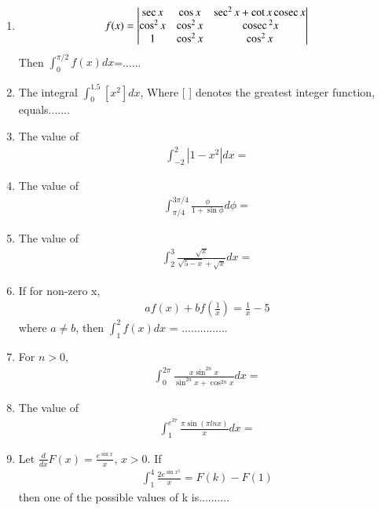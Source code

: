 \renewcommand{\theequation}{\theenumi}
\begin{enumerate}[label=\arabic*.,ref=\thesubsection.\theenumi]

\item 
\begin{align*}
f(x) = \begin{vmatrix}
\sec x & \cos x & \sec^{2}x + \cot x \,\text{cosec}\, x \\ \cos^{2}x & \cos^{2}x & \,\text{cosec}\,^{2}x \\ 1 & \cos^{2}x & \cos^{2}x
\end{vmatrix}
\end{align*}
Then $\int_{0}^{\pi/2}f(x)dx$=......

\item The integral $\int_{0}^{1.5}[x^{2}]dx$, Where [ ] denotes the greatest integer function, equals.......

\item The value of 
\begin{align*}
\int_{-2}^{2}|1 - x^{2}|dx = 
\end{align*}

\item The value of 
\begin{align*}
\int_{\pi/4}^{3\pi/4}\frac{\phi}{1 + \sin\phi}d\phi = 
\end{align*}

\item The value of 
\begin{align*}
\int_{2}^{3}\frac{\sqrt{x}}{\sqrt{5 - x} + \sqrt{x}}dx = 
\end{align*}

\item If for non-zero x, 
\begin{align*}
af(x) + bf\left(\frac{1}{x}\right) = \frac{1}{x} - 5
\end{align*}
where $a \neq b$, then $\int_{1}^{2}f(x)dx$ = ...............

\item For $n > 0$, 
\begin{align*}
\int_{0}^{2\pi}\frac{x\sin^{2n}x}{\sin^{2n}x + \cos^{2n}x}dx = 
\end{align*}

\item The value of 
\begin{align*}
\int_{1}^{e^{37}}\frac{\pi \sin(\pi lnx)}{x}dx = 
\end{align*}

\item Let $\frac{d}{dx}F(x) = \frac{e^{\sin x}}{x}$, $x > 0$. If
\begin{align*}
\int_{1}^{4} \frac{2e^{\sin x^{2}}}{x} = F(k) - F(1)
\end{align*}
then one of the possible values of k is..........


\end{enumerate}
